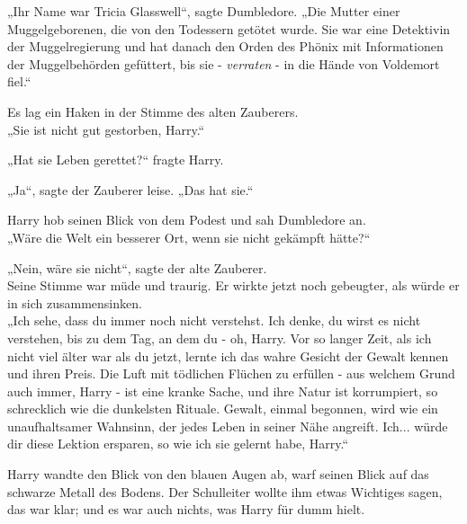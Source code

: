 {„Ihr Name war Tricia Glasswell“, sagte Dumbledore. „Die Mutter einer Muggelgeborenen, die von den Todessern getötet wurde. Sie war eine Detektivin der Muggelregierung und hat danach den Orden des Phönix mit Informationen der Muggelbehörden gefüttert, bis sie - \emph{verraten} - in die Hände von Voldemort fiel.“

Es lag ein Haken in der Stimme des alten Zauberers.\\ „Sie ist nicht gut gestorben, Harry.“

„Hat sie Leben gerettet?“ fragte Harry.

„Ja“, sagte der Zauberer leise. „Das hat sie.“

Harry hob seinen Blick von dem Podest und sah Dumbledore an.\\ „Wäre die Welt ein besserer Ort, wenn sie nicht gekämpft hätte?“

„Nein, wäre sie nicht“, sagte der alte Zauberer.\\ Seine Stimme war müde und traurig. Er wirkte jetzt noch gebeugter, als würde er in sich zusammensinken.\\ „Ich sehe, dass du immer noch nicht verstehst. Ich denke, du wirst es nicht verstehen, bis zu dem Tag, an dem du - oh, Harry. Vor so langer Zeit, als ich nicht viel älter war als du jetzt, lernte ich das wahre Gesicht der Gewalt kennen und ihren Preis. Die Luft mit tödlichen Flüchen zu erfüllen - aus welchem Grund auch immer, Harry - ist eine kranke Sache, und ihre Natur ist korrumpiert, so schrecklich wie die dunkelsten Rituale. Gewalt, einmal begonnen, wird wie ein unaufhaltsamer Wahnsinn, der jedes Leben in seiner Nähe angreift. Ich... würde dir diese Lektion ersparen, so wie ich sie gelernt habe, Harry.“

Harry wandte den Blick von den blauen Augen ab, warf seinen Blick auf das schwarze Metall des Bodens. Der Schulleiter wollte ihm etwas Wichtiges sagen, das war klar; und es war auch nichts, was Harry für dumm hielt.

}
